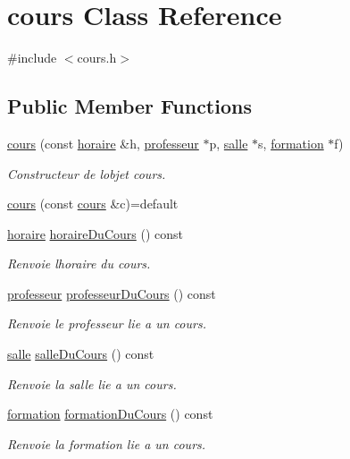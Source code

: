 \hypertarget{classcours}{}\section{cours Class Reference}
\label{classcours}


{\ttfamily \#include $<$cours.\+h$>$}

\subsection*{Public Member Functions}
\begin{DoxyCompactItemize}
\item 
\hyperlink{classcours_a97d927797b98f0f6986461e85757d23c}{cours} (const \hyperlink{classhoraire}{horaire} \&h, \hyperlink{classprofesseur}{professeur} $\ast$p, \hyperlink{classsalle}{salle} $\ast$s, \hyperlink{classformation}{formation} $\ast$f)
\begin{DoxyCompactList}\small\item\em Constructeur de l\textquotesingle{}objet cours. \end{DoxyCompactList}\item 
\hyperlink{classcours_a95b69b7789c5dab7116c0b89d78197ec}{cours} (const \hyperlink{classcours}{cours} \&c)=default
\item 
\hyperlink{classhoraire}{horaire} \hyperlink{classcours_af09cffcbd77d17a2100bdacf0f1fb2a9}{horaire\+Du\+Cours} () const
\begin{DoxyCompactList}\small\item\em Renvoie l\textquotesingle{}horaire du cours. \end{DoxyCompactList}\item 
\hyperlink{classprofesseur}{professeur} \hyperlink{classcours_a84b7b5ac9221a3edcaf142c8b28152cb}{professeur\+Du\+Cours} () const
\begin{DoxyCompactList}\small\item\em Renvoie le professeur lie a un cours. \end{DoxyCompactList}\item 
\hyperlink{classsalle}{salle} \hyperlink{classcours_af98361045fec0b63de23c45d3853fb57}{salle\+Du\+Cours} () const
\begin{DoxyCompactList}\small\item\em Renvoie la salle lie a un cours. \end{DoxyCompactList}\item 
\hyperlink{classformation}{formation} \hyperlink{classcours_a6f2b466ed292ca0152a90c34509be8af}{formation\+Du\+Cours} () const
\begin{DoxyCompactList}\small\item\em Renvoie la formation lie a un cours. \end{DoxyCompactList}\end{DoxyCompactItemize}


